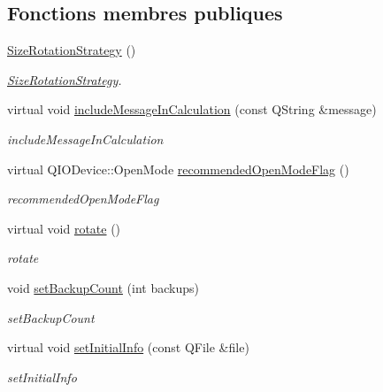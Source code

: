 \subsection*{Fonctions membres publiques}
\begin{DoxyCompactItemize}
\item 
\hyperlink{classQsLogging_1_1SizeRotationStrategy_a669845e1cd8a1656b28fbce8a97620b2}{Size\-Rotation\-Strategy} ()
\begin{DoxyCompactList}\small\item\em \hyperlink{classQsLogging_1_1SizeRotationStrategy}{Size\-Rotation\-Strategy}. \end{DoxyCompactList}\item 
virtual void \hyperlink{classQsLogging_1_1SizeRotationStrategy_a3f87aec42ff67a771e31695923935486}{include\-Message\-In\-Calculation} (const Q\-String \&message)
\begin{DoxyCompactList}\small\item\em include\-Message\-In\-Calculation \end{DoxyCompactList}\item 
virtual Q\-I\-O\-Device\-::\-Open\-Mode \hyperlink{classQsLogging_1_1SizeRotationStrategy_a456726dba9e9ddd0c823bbbc1a6a7279}{recommended\-Open\-Mode\-Flag} ()
\begin{DoxyCompactList}\small\item\em recommended\-Open\-Mode\-Flag \end{DoxyCompactList}\item 
virtual void \hyperlink{classQsLogging_1_1SizeRotationStrategy_a044a258f08b3f104ccc7fdd80bf45b1a}{rotate} ()
\begin{DoxyCompactList}\small\item\em rotate \end{DoxyCompactList}\item 
void \hyperlink{classQsLogging_1_1SizeRotationStrategy_ab50da4fb0397509e5aeb826e791f09f9}{set\-Backup\-Count} (int backups)
\begin{DoxyCompactList}\small\item\em set\-Backup\-Count \end{DoxyCompactList}\item 
virtual void \hyperlink{classQsLogging_1_1SizeRotationStrategy_a763f6a2054a6ec5f3600f4e43e07c802}{set\-Initial\-Info} (const Q\-File \&file)
\begin{DoxyCompactList}\small\item\em set\-Initial\-Info \end{DoxyCompactList}\item 

\end{DoxyCompactItemize}
